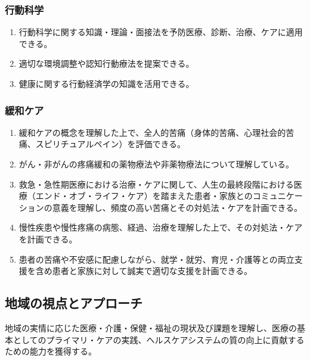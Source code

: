 \hypertarget{ux884cux52d5ux79d1ux5b66}{%
\subsubsection{行動科学}\label{ux884cux52d5ux79d1ux5b66}}

\begin{enumerate}
\def\labelenumi{\arabic{enumi}.}
\tightlist
\item
  行動科学に関する知識・理論・面接法を予防医療、診断、治療、ケアに適用できる。
\item
  適切な環境調整や認知行動療法を提案できる。
\item
  健康に関する行動経済学の知識を活用できる。
\end{enumerate}

\hypertarget{ux7de9ux548cux30b1ux30a2}{%
\subsubsection{緩和ケア}\label{ux7de9ux548cux30b1ux30a2}}

\begin{enumerate}
\def\labelenumi{\arabic{enumi}.}
\tightlist
\item
  緩和ケアの概念を理解した上で、全人的苦痛（身体的苦痛、心理社会的苦痛、スピリチュアルペイン）を評価できる。
\item
  がん・非がんの疼痛緩和の薬物療法や非薬物療法について理解している。
\item
  救急・急性期医療における治療・ケアに関して、人生の最終段階における医療（エンド・オブ・ライフ・ケア）を踏まえた患者・家族とのコミュニケーションの意義を理解し、頻度の高い苦痛とその対処法・ケアを計画できる。
\item
  慢性疾患や慢性疼痛の病態、経過、治療を理解した上で、その対処法・ケアを計画できる。
\item
  患者の苦痛や不安感に配慮しながら、就学・就労、育児・介護等との両立支援を含め患者と家族に対して誠実で適切な支援を計画できる。
\end{enumerate}

\hypertarget{ux5730ux57dfux306eux8996ux70b9ux3068ux30a2ux30d7ux30edux30fcux30c1}{%
\subsection{地域の視点とアプローチ}\label{ux5730ux57dfux306eux8996ux70b9ux3068ux30a2ux30d7ux30edux30fcux30c1}}

地域の実情に応じた医療・介護・保健・福祉の現状及び課題を理解し、医療の基本としてのプライマリ・ケアの実践、ヘルスケアシステムの質の向上に貢献するための能力を獲得する。

